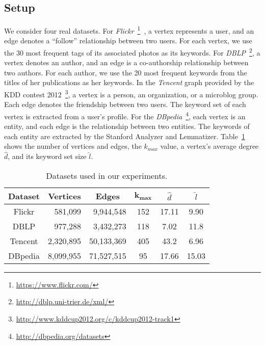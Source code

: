 \subsection{Setup}
\label{setup}

We consider four real datasets. For {\it Flickr}~\footnote{\url{https://www.flickr.com/}}~\cite{thomee2015new}, a vertex represents a user, and an edge denotes a ``follow'' relationship between two users. For each vertex, we use the 30 most frequent tags of its associated photos as its keywords.
For {\it DBLP}~\footnote{\url{http://dblp.uni-trier.de/xml/}}, a vertex denotes an author, and an edge is a co-authorship relationship between two authors.
For each author, we use the 20 most frequent keywords from the titles of her publications as her keywords.
In the {\it Tencent} graph provided by the KDD contest 2012~\footnote{\url{http://www.kddcup2012.org/c/kddcup2012-track1}}, a vertex is a person, an organization, or a microblog group. Each edge denotes the friendship between two users. The keyword set of each vertex is extracted from a user's profile. For the {\it DBpedia}~\footnote{\url{http://dbpedia.org/datasets}}, each vertex is an entity, and each edge is the relationship between two entities. The keywords of each entity are extracted by the Stanford Analyzer and Lemmatizer.
Table~\ref{tab:dataset} shows the number of vertices and edges, the $k_{max}$ value, a vertex's average degree $\widehat d$, and its keyword set size $\widehat l$.

\begin{table}[h]
  \centering \footnotesize \caption {Datasets used in our experiments.}\label{tab:dataset}
  \begin{tabular}{c|r|r|c|c|c}
     \hline
          {\bf Dataset}  & \multicolumn{1}{c|}{\textbf{Vertices}}
                         & \multicolumn{1}{c|}{\textbf{Edges}}
                         & $\bm{k_{max}}$
                         & \textbf{\emph{{$\widehat d$}}}
                         & \textbf{\emph{{$\widehat l$}}}\\
     \hline\hline
          Flickr         &  581,099      &  9,944,548   &   152   & 17.11  &  9.90 \\
     \hline
          DBLP           &  977,288      &  3,432,273   &   118   &  7.02  &  11.8 \\
     \hline
          Tencent        &  2,320,895    &  50,133,369  &   405   &  43.2  &  6.96 \\
     \hline
          DBpedia        &  8,099,955    &  71,527,515  &    95   &  17.66  &  15.03 \\
     \hline
  \end{tabular}
\end{table}

